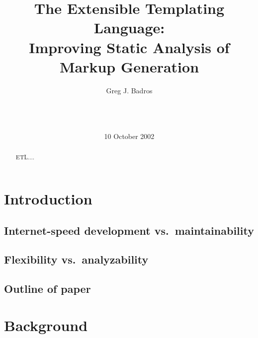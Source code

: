 \documentclass{www2003-submission}
\begin{document}
%
\title{The Extensible Templating Language: \\
       Improving Static Analysis of Markup Generation}


\author{
%
\alignauthor Greg J. Badros\\
       \\
       \\
       \\
}
\date{10 October 2002}
\maketitle
\begin{abstract}
ETL....
\end{abstract}




\section{Introduction}

\subsection{Internet-speed development vs.\ maintainability}

\subsection{Flexibility vs.\ analyzability}

\subsection{Outline of paper}


\section{Background}
\end{document}
